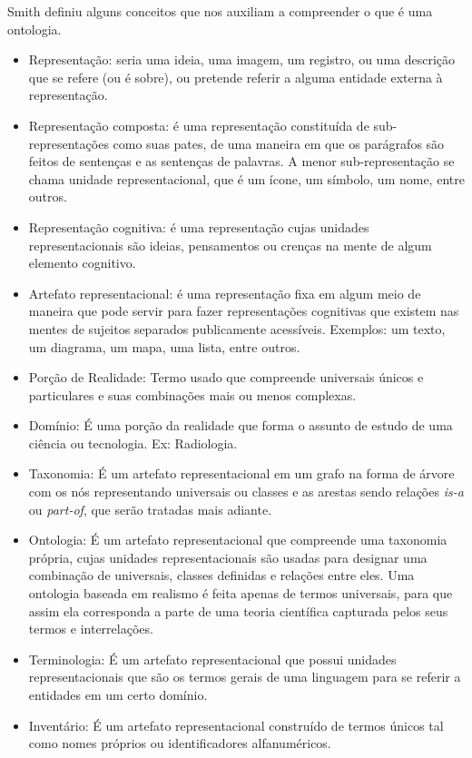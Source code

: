 Smith \cite{ontoSmith} definiu alguns conceitos que nos auxiliam a compreender o que é uma ontologia.

\begin{itemize}
	\item Representação: seria uma ideia, uma imagem, um registro, ou uma descrição que se refere (ou é sobre), ou pretende referir a alguma entidade externa à representação.
	\item Representação composta: é uma representação constituída de sub-representações como suas pates, de uma maneira em que os parágrafos são feitos de sentenças e as sentenças de palavras. A menor sub-representação se chama unidade representacional, que é um ícone, um símbolo, um nome, entre outros.
	\item Representação cognitiva: é uma representação cujas unidades representacionais são ideias, pensamentos ou crenças na mente de algum elemento cognitivo.
	\item Artefato representacional: é uma representação fixa em algum meio de maneira que pode servir para fazer representações cognitivas 
	que existem nas mentes de sujeitos separados publicamente acessíveis. Exemplos: um texto, um diagrama, um mapa, uma lista, entre outros.
	\item Porção de Realidade: Termo usado que compreende universais únicos e particulares e suas combinações mais ou menos complexas.
	\item Domínio: É uma porção da realidade que forma o assunto de estudo de uma ciência ou tecnologia. Ex: Radiologia.
	\item Taxonomia: É um artefato representacional em um grafo na forma de árvore com os nós representando universais ou classes e as arestas sendo relações \textit{is-a} ou \textit{part-of}, que serão tratadas mais adiante.
	\item Ontologia: É um artefato representacional que compreende uma taxonomia própria, cujas unidades representacionais são usadas para designar uma combinação de universais, classes definidas e relações entre eles. Uma ontologia baseada em realismo é feita apenas de termos universais, para que assim ela corresponda a parte de uma teoria científica capturada pelos seus termos e interrelações.
	\item Terminologia: É um artefato representacional que possui unidades representacionais que são os termos gerais de uma linguagem para se referir a entidades em um certo domínio.
	\item Inventário: É um artefato representacional construído de termos únicos tal como nomes próprios ou identificadores alfanuméricos.
\end{itemize} 

